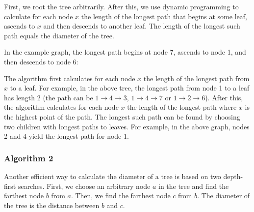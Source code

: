 First, we root the tree arbitrarily.
After this, we use dynamic programming
to calculate for each node $x$
the length of the longest path that begins at some leaf,
ascends to $x$ and then descends to another leaf.
The length of the
longest such path equals the diameter of the tree.

In the example graph, the longest path begins at node 7,
ascends to node 1, and then descends to node 6:
\begin{center}
\end{center}

The algorithm first calculates for each node $x$
the length of the longest path from $x$ to a leaf.
For example, in the above tree,
the longest path from node 1 to a leaf has length 2
(the path can be $1 \rightarrow 4 \rightarrow 3$,
$1 \rightarrow 4 \rightarrow 7$ or $1 \rightarrow 2 \rightarrow 6$).
After this, the algorithm calculates for each node
$x$ the length of the longest path where $x$
is the highest point of the path.
The longest such path can be found by choosing
two children with longest paths to leaves.
For example, in the above graph, 
nodes 2 and 4 yield the longest path for node 1.

\subsubsection{Algorithm 2}

Another efficient way to calculate the diameter
of a tree is based on two depth-first searches.
First, we choose an arbitrary node $a$ in the tree
and find the farthest node $b$ from $a$.
Then, we find the farthest node $c$ from $b$.
The diameter of the tree is the distance between $b$ and $c$.

